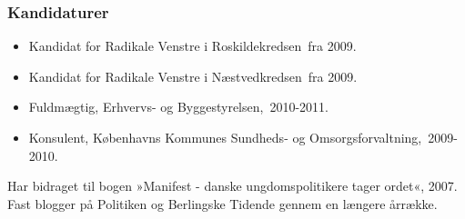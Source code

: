 \documentclass[11pt, a4paper]{awesome-cv}
\begin{document}
\begin{cvletter}
\subsubsection*{Kandidaturer}
\begin{itemize}
\item Kandidat for Radikale Venstre i Roskildekredsen fra 2009.
\item Kandidat for Radikale Venstre i Næstvedkredsen fra 2009.
\end{itemize}
\begin{itemize}
\item Fuldmægtig, Erhvervs- og Byggestyrelsen, 2010-2011.
\item Konsulent, Københavns Kommunes Sundheds- og Omsorgsforvaltning, 2009-2010.
\end{itemize}
Har bidraget til bogen »Manifest - danske ungdomspolitikere tager ordet«, 2007. Fast blogger på Politiken og Berlingske Tidende gennem en længere årrække.

\end{cvletter}
\end{document}
